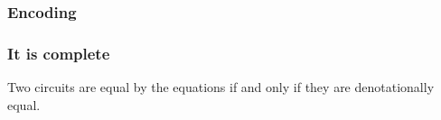 \begin{frame}
    \frametitle{Encoding}



\end{frame}

\begin{frame}
    \frametitle{It is complete}

    \LARGE

    \begin{theorem}
        Two circuits are equal by the equations if and only if they are
        denotationally equal.
    \end{theorem}

\end{frame}